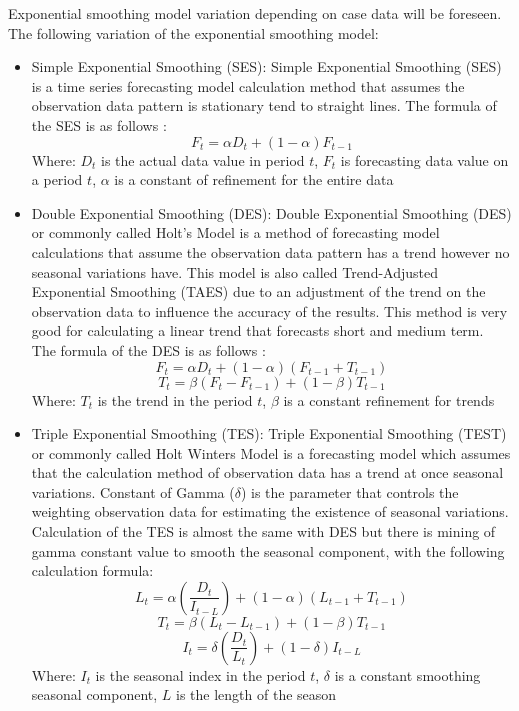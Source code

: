 \documentclass[conference]{IEEEtran}
\begin{document}
Exponential smoothing model variation depending on case data will be foreseen. The following variation of the exponential smoothing model:

\begin{itemize}
    \item Simple Exponential Smoothing (SES): Simple Exponential Smoothing (SES) is a time series forecasting model calculation method that assumes the observation data pattern is stationary tend to straight lines. The formula of the SES is as follows \cite{b12}:
    \[ F_t = \alpha D_t + (1 - \alpha) F_{t-1} \]
    Where:
    \( D_t \) is the actual data value in period \( t \),
    \( F_t \) is forecasting data value on a period \( t \),
    \( \alpha \) is a constant of refinement for the entire data
    
    \item Double Exponential Smoothing (DES): Double Exponential Smoothing (DES) or commonly called Holt's Model is a method of forecasting model calculations that assume the observation data pattern has a trend however no seasonal variations have. This model is also called Trend-Adjusted Exponential Smoothing (TAES) due to an adjustment of the trend on the observation data to influence the accuracy of the results. This method is very good for calculating a linear trend that forecasts short and medium term. The formula of the DES is as follows \cite{b13}:
    \[ F_t = \alpha D_t + (1 - \alpha)(F_{t-1} + T_{t-1}) \]
    \[ T_t = \beta (F_t - F_{t-1}) + (1 - \beta)T_{t-1} \]
    Where:
    \( T_t \) is the trend in the period \( t \),
    \( \beta \) is a constant refinement for trends
    
    \item Triple Exponential Smoothing (TES): Triple Exponential Smoothing (TEST) or commonly called Holt Winters Model is a forecasting model which assumes that the calculation method of observation data has a trend at once seasonal variations. Constant of Gamma (\( \delta \)) is the parameter that controls the weighting observation data for estimating the existence of seasonal variations. Calculation of the TES is almost the same with DES but there is mining of gamma constant value to smooth the seasonal component, with the following calculation formula:
    \[ L_{t} = \alpha \left( \frac{D_{t}}{I_{t-L}} \right) + (1 - \alpha)(L_{t-1} + T_{t-1}) \]
    \[ T_{t} = \beta (L_{t} - L_{t-1}) + (1 - \beta)T_{t-1} \]
    \[ I_{t} = \delta \left( \frac{D_{t}}{L_{t}} \right) + (1 - \delta)I_{t-L} \]
    Where:
    \( I_t \) is the seasonal index in the period \( t \),
    \( \delta \) is a constant smoothing seasonal component,
    \( L \) is the length of the season
    
\end{itemize}
\end{document}
